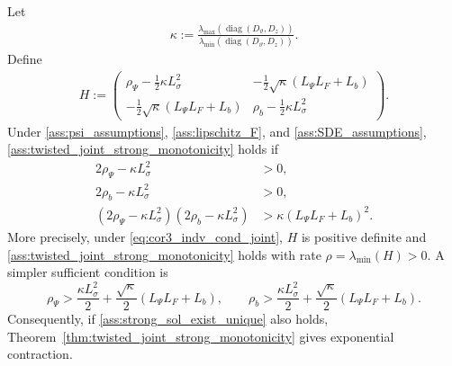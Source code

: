 \begin{corollary}
\label{cor:separate_monotonicity}
Let
\begin{align*}
\kappa:=
\frac{\lambda_{\max}(\operatorname{diag}(D_\vartheta,D_z))}
{\lambda_{\min}(\operatorname{diag}(D_\vartheta,D_z))}.
\end{align*}
Define
\begin{align*}
H:=
\begin{pmatrix}
\rho_\Psi-\frac12\kappa L_\sigma^2&
-\frac12\sqrt\kappa(L_\Psi L_F+L_b)\\
-\frac12\sqrt\kappa(L_\Psi L_F+L_b)&
\rho_b-\frac12\kappa L_\sigma^2
\end{pmatrix}.
\end{align*}
Under \ref{ass:psi_assumptions},
\ref{ass:lipschitz_F}, and \ref{ass:SDE_assumptions},
\ref{ass:twisted_joint_strong_monotonicity} holds if
\begin{equation}
\label{eq:cor3_indv_cond_joint}
\begin{aligned}
2\rho_\Psi-\kappa L_\sigma^2&>0,\\
2\rho_b-\kappa L_\sigma^2&>0,\\
(2\rho_\Psi-\kappa L_\sigma^2)
(2\rho_b-\kappa L_\sigma^2)
&>
\kappa(L_\Psi L_F+L_b)^2.
\end{aligned}
\end{equation}
More precisely, under \eqref{eq:cor3_indv_cond_joint}, $H$ is positive
definite and \ref{ass:twisted_joint_strong_monotonicity} holds with rate
$\rho=\lambda_{\min}(H)>0$.
A simpler sufficient condition is
\begin{equation}
\label{eq:cor3_indv_cond_separate}
\rho_\Psi
>
\frac{\kappa L_\sigma^2}{2}
+
\frac{\sqrt\kappa}{2}(L_\Psi L_F+L_b),
\qquad
\rho_b
>
\frac{\kappa L_\sigma^2}{2}
+
\frac{\sqrt\kappa}{2}(L_\Psi L_F+L_b).
\end{equation}
Consequently, if \ref{ass:strong_sol_exist_unique} also holds,
Theorem~\ref{thm:twisted_joint_strong_monotonicity} gives exponential
contraction.
\end{corollary}

